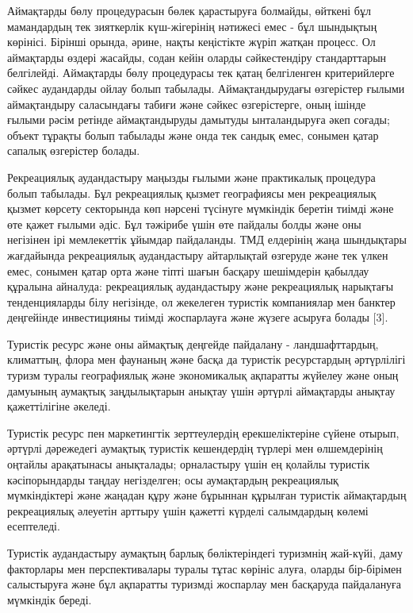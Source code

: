 Аймақтарды бөлу процедурасын бөлек қарастыруға болмайды, өйткені бұл
мамандардың тек зияткерлік күш-жігерінің нәтижесі емес - бұл шындықтың
көрінісі. Бірінші орында, әрине, нақты кеңістікте жүріп жатқан процесс.
Ол аймақтарды өздері жасайды, содан кейін оларды сәйкестендіру
стандарттарын белгілейді. Аймақтарды бөлу процедурасы тек қатаң
белгіленген критерийлерге сәйкес аудандарды ойлау болып табылады.
Аймақтандырудағы өзгерістер ғылыми аймақтандыру саласындағы табиғи және
сәйкес өзгерістерге, оның ішінде ғылыми рәсім ретінде аймақтандыруды
дамытуды ынталандыруға әкеп соғады; объект тұрақты болып табылады және
онда тек сандық емес, сонымен қатар сапалық өзгерістер болады.

Рекреациялық аудандастыру маңызды ғылыми және практикалық процедура
болып табылады. Бұл рекреациялық қызмет географиясы мен рекреациялық
қызмет көрсету секторында көп нәрсені түсінуге мүмкіндік беретін тиімді
және өте қажет ғылыми әдіс. Бұл тәжірибе үшін өте пайдалы болды және оны
негізінен ірі мемлекеттік ұйымдар пайдаланды. ТМД елдерінің жаңа
шындықтары жағдайында рекреациялық аудандастыру айтарлықтай өзгеруде
және тек үлкен емес, сонымен қатар орта және тіпті шағын басқару
шешімдерін қабылдау құралына айналуда: рекреациялық аудандастыру және
рекреациялық нарықтағы тенденцияларды білу негізінде, ол жекелеген
туристік компаниялар мен банктер деңгейінде инвестицияны тиімді
жоспарлауға және жүзеге асыруға болады {[}3{]}.

Туристік ресурс және оны аймақтық деңгейде пайдалану - ландшафттардың,
климаттың, флора мен фаунаның және басқа да туристік ресурстардың
әртүрлілігі туризм туралы географиялық және экономикалық ақпаратты
жүйелеу және оның дамуының аумақтық заңдылықтарын анықтау үшін әртүрлі
аймақтарды анықтау қажеттілігіне әкеледі.

Туристік ресурс пен маркетингтік зерттеулердің ерекшеліктеріне сүйене
отырып, әртүрлі дәрежедегі аумақтық туристік кешендердің түрлері мен
өлшемдерінің оңтайлы арақатынасы анықталады; орналастыру үшін ең қолайлы
туристік кәсіпорындарды таңдау негізделген; осы аумақтардың рекреациялық
мүмкіндіктері және жаңадан құру және бұрыннан құрылған туристік
аймақтардың рекреациялық әлеуетін арттыру үшін қажетті күрделі
салымдардың көлемі есептеледі.

Туристік аудандастыру аумақтың барлық бөліктеріндегі туризмнің жай-күйі,
даму факторлары мен перспективалары туралы тұтас көрініс алуға, оларды
бір-бірімен салыстыруға және бұл ақпаратты туризмді жоспарлау мен
басқаруда пайдалануға мүмкіндік береді.

